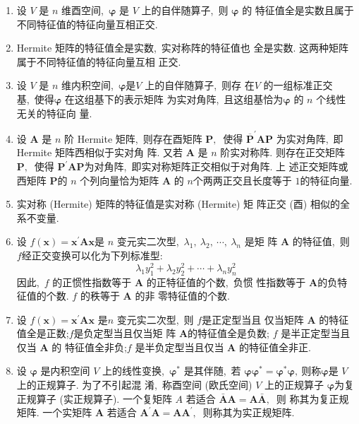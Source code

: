 \begin{enumerate}
		\item 设  $V$  是 $ n $ 维酉空间,\ $ \boldsymbol{\varphi}$ 是  $V$  上的自伴随算子,\  则  $\boldsymbol{\varphi}$ 的 特征值全是实数且属于不同特征值的特征向量互相正交.
		\item Hermite 矩阵的特征值全是实数,\  实对称阵的特征值也 全是实数. 这两种矩阵属于不同特征值的特征向量互相 正交.
		\item 设 $ V $ 是  $n $ 维内积空间,\  $\boldsymbol{\varphi} $是$  V $ 上的自伴随算子,\  则存 在$  V $ 的一组标准正交基,\  使得$ \boldsymbol{\varphi}$ 在这组基下的表示矩阵 为实对角阵,\  且这组基恰为$ \boldsymbol{\varphi}$  的 $ n$  个线性无关的特征向 量.
		\item 设  $\boldsymbol{A}$  是  $n $ 阶 Hermite 矩阵,\  则存在酉矩阵  $\boldsymbol{P} ,\ $ 使得  $\overline{\boldsymbol{P}}^{\prime} \boldsymbol{A P} $ 为实对角阵,\  即 Hermite 矩阵西相似于实对角 阵. 又若  $\boldsymbol{A} $ 是  $n$  阶实对称阵. 则存在正交矩阵  $\boldsymbol{P} ,\ $ 使得  $\boldsymbol{P}^{\prime} \boldsymbol{A} \boldsymbol{P}  $为对角阵,\  即实对称矩阵正交相似于对角阵. 上 述正交矩阵或西矩阵  $\boldsymbol{P}  $的  $n $ 个列向量恰为矩阵  $\boldsymbol{A} $ 的 $ n  $个两两正交且长度等于 $1 $的特征向量.
		\item 实对称 (Hermite) 矩阵的特征值是实对称 (Hermite) 矩 阵正交 (酉) 相似的全系不变量.
		\item 设  $f(\boldsymbol{x})=\boldsymbol{x}^{\prime} \boldsymbol{A} \boldsymbol{x}  $是 $ n$  变元实二次型,\  $ \lambda_{1},\  \lambda_{2},\  \cdots,\  \lambda_{n} $ 是矩 阵 $ \boldsymbol{A} $ 的特征值,\  则  $f  $经正交变换可以化为下列标准型:
		$$\lambda_{1} y_{1}^{2}+\lambda_{2} y_{2}^{2}+\cdots+\lambda_{n} y_{n}^{2}$$
		因此,\  $ f $ 的正惯性指数等于 $ \boldsymbol{A} $ 的正特征值的个数,\  负惯 性指数等于  $\boldsymbol{A}  $的负特征值的个数. $ f $ 的秩等于  $\boldsymbol{A} $ 的非 零特征值的个数.
		\item 设 $ f(\boldsymbol{x})=\boldsymbol{x}^{\prime} \boldsymbol{A} \boldsymbol{x}$  是$  n$  变元实二次型,\  则  $f  $是正定型当且 仅当矩阵  $\boldsymbol{A} $ 的特征值全是正数;$  f  $是负定型当且仅当矩 阵  $\boldsymbol{A}  $的特征值全是负数;  $f $ 是半正定型当且仅当  $\boldsymbol{A} $ 的 特征值全非负;$  f $ 是半负定型当且仅当  $\boldsymbol{A} $ 的特征值全非正.
		\item 设  $\boldsymbol{\varphi}$  是内积空间 $ V$  上的线性变换,\   $\boldsymbol{\varphi}^{*} $ 是其伴随,\  若 $ \boldsymbol{\varphi} \boldsymbol{\varphi}^{*}=\boldsymbol{\varphi}^{*}\boldsymbol{\varphi} ,\  $则称$ \boldsymbol{\varphi}  $是  $V $ 上的正规算子. 为了不引起混 淆,\  称酉空间 (欧氏空间) $ V$  上的正规算子  $\boldsymbol{\varphi} $为复正规算子 (实正规算子). 一个复矩阵  $A $ 若适合  $\bar{\boldsymbol{A}} \boldsymbol{A}=\boldsymbol{A}\bar{\boldsymbol{A}} ,\ $ 则 称其为复正规矩阵. 一个实矩阵  $\boldsymbol{A} $ 若适合  $\boldsymbol{A}^{\prime} \boldsymbol{A}=\boldsymbol{A} \boldsymbol{A}^{\prime} ,\ $ 则称其为实正规矩阵.

\end{enumerate}
